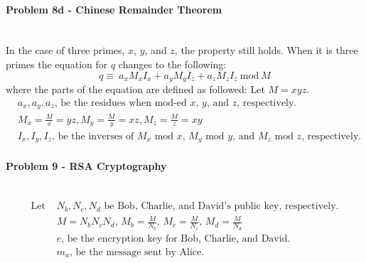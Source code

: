 \documentclass[fleqn]{article}
\begin{document}
\paragraph{Problem 8d - Chinese Remainder Theorem} ~\\
In the case of three primes, $x$, $y$, and $z$, the property still holds.  When it is three primes the equation for $q$ changes to the following:
\begin{equation*}
q \equiv\ a_xM_xI_x + a_yM_yI_z + a_zM_zI_z\ \textrm{mod}\ M
\end{equation*}
where the parts of the equation are defined as followed:
Let $M=xyz$.
\begin{align*}
&a_x, a_y, a_z \text{, be the residues when mod-ed $x$, $y$, and $z$, respectively.}\\
&M_x=\frac{M}{x}=yz, M_y=\frac{M}{y}=xz, M_z=\frac{M}{z}=xy\\
&I_x, I_y, I_z \text{, be the inverses of $M_x$ mod $x$, $M_y$ mod $y$, and $M_z$ mod $z$, respectively.}
\end{align*}
\paragraph{Problem 9 - RSA Cryptography} ~\\
\begin{align*}
	\text{Let } &N_{b}, N_{c}, N_{d} \text{ be Bob, Charlie, and David's public key, respectively.}\\	
	&M=N_{b}N_{c}N_{d}\text{, }M_{b}=\frac{M}{N_{b}}\text{, }M_{c}=\frac{M}{N_{c}}\text{, }M_{d}=\frac{M}{N_{d}}\\
	&e\text{, be the encryption key for Bob, Charlie, and David.}\\
	&m_{a} \text{, be the message sent by Alice.}
\end{align*}
\end{document}
